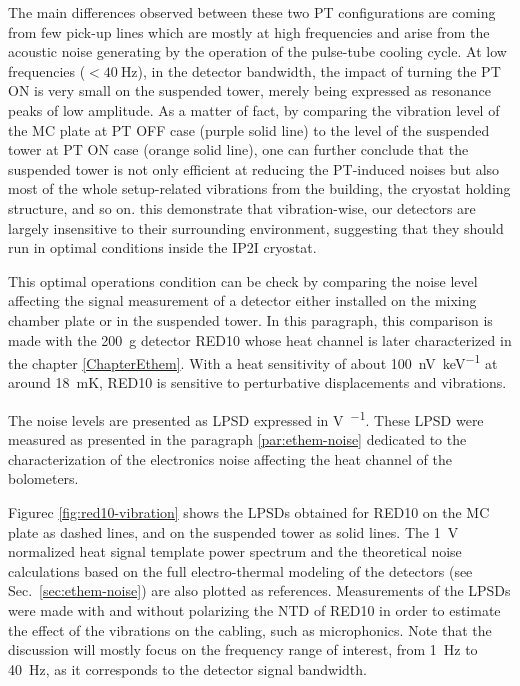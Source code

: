 The main differences observed between these two PT configurations are coming from few pick-up lines which are mostly at high frequencies and arise from the acoustic noise generating by the operation of the pulse-tube cooling cycle.
At low frequencies ($<\SI{40}{\Hz}$), in the detector bandwidth, the impact of turning the PT ON is very small on the suspended tower, merely being expressed as resonance peaks of low amplitude.
As a matter of fact, by comparing the vibration level of the MC plate at PT OFF case (purple solid line) to the level of the suspended tower at PT ON case (orange solid line), one can further conclude that the suspended tower is not only efficient at reducing the PT-induced noises but also most of the whole setup-related vibrations from the building, the cryostat holding structure, and so on.
this demonstrate that vibration-wise, our detectors are largely insensitive to their surrounding environment, suggesting that they should run in optimal conditions inside the IP2I cryostat.

This optimal operations condition can be check by comparing the noise level affecting the signal measurement of a detector either installed on the mixing chamber plate or in the suspended tower. In this paragraph, this comparison is made with the \SI{200}{\g} detector RED10 whose heat channel is later characterized in the chapter \ref{ChapterEthem}. With a heat sensitivity of about \SI{100}{\nano\volt\per\kilo\eV} at around \SI{18}{\milli\kelvin}, RED10 is sensitive to perturbative displacements and vibrations. 

The noise levels are presented as LPSD expressed in \si{\volt\per\sqrthz}. These LPSD were measured as presented in the paragraph \ref{par:ethem-noise} dedicated to the characterization of the electronics noise affecting the heat channel of the bolometers.

Figurec \ref{fig:red10-vibration} shows the LPSDs obtained for RED10 on the MC plate as dashed lines, and on the suspended tower as solid lines. The \SI{1}{\volt} normalized heat signal template power spectrum and the theoretical noise calculations based on the full electro-thermal modeling of the detectors (see Sec.~\ref{sec:ethem-noise}) are also plotted as references. Measurements of the LPSDs were made with and without polarizing the NTD of RED10 in order to estimate the effect of the vibrations on the cabling, such as microphonics. Note that the discussion will mostly focus on the frequency range of interest, from \SI{1}{\Hz} to \SI{40}{\Hz}, as it corresponds to the detector signal bandwidth.


